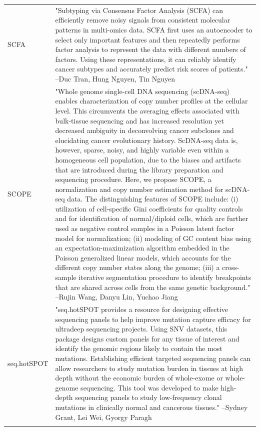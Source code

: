 \begin{longtable}[t]{l>{\raggedright\arraybackslash}p{25em}}
SCFA & "Subtyping via Consensus Factor Analysis (SCFA) can
efficiently remove noisy signals from consistent molecular
patterns in multi-omics data. SCFA first uses an autoencoder to
select only important features and then repeatedly performs
factor analysis to represent the data with different numbers of
factors. Using these representations, it can reliably identify
cancer subtypes and accurately predict risk scores of patients." --Duc Tran, Hung Nguyen, Tin Nguyen\\
SCOPE & "Whole genome single-cell DNA sequencing (scDNA-seq)
enables characterization of copy number profiles at the
cellular level. This circumvents the averaging effects
associated with bulk-tissue sequencing and has increased
resolution yet decreased ambiguity in deconvolving cancer
subclones and elucidating cancer evolutionary history.
ScDNA-seq data is, however, sparse, noisy, and highly variable
even within a homogeneous cell population, due to the biases
and artifacts that are introduced during the library
preparation and sequencing procedure. Here, we propose SCOPE, a
normalization and copy number estimation method for scDNA-seq
data. The distinguishing features of SCOPE include: (i)
utilization of cell-specific Gini coefficients for quality
controls and for identification of normal/diploid cells, which
are further used as negative control samples in a Poisson
latent factor model for normalization; (ii) modeling of GC
content bias using an expectation-maximization algorithm
embedded in the Poisson generalized linear models, which
accounts for the different copy number states along the genome;
(iii) a cross-sample iterative segmentation procedure to
identify breakpoints that are shared across cells from the same
genetic background." --Rujin Wang, Danyu Lin, Yuchao Jiang\\
seq.hotSPOT & "seq.hotSPOT provides a resource for designing effective
sequencing panels to help improve mutation capture efficacy for
ultradeep sequencing projects. Using SNV datasets, this package
designs custom panels for any tissue of interest and identify
the genomic regions likely to contain the most mutations.
Establishing efficient targeted sequencing panels can allow
researchers to study mutation burden in tissues at high depth
without the economic burden of whole-exome or whole-genome
sequencing. This tool was developed to make high-depth
sequencing panels to study low-frequency clonal mutations in
clinically normal and cancerous tissues." --Sydney Grant, Lei Wei, Gyorgy Paragh\\
\addlinespace

\end{longtable}
